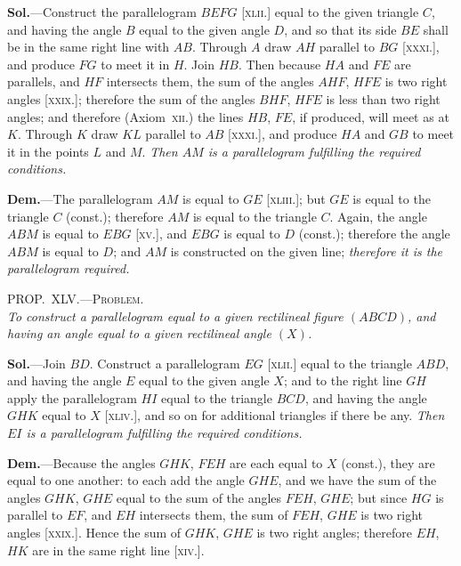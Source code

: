 \documentclass[oneside]{book}
\newcommand\myprop[2]{
\bigskip\Needspace*{4\baselineskip}\begin{center}\textsc{#1}\\\medskip\emph{#2}\par\end{center}
}
\newcommand\imgcent[2]{
\begin{center}

\end{center}
}
\begin{document}
\textbf{Sol.}---Construct the parallelogram $BEFG$ [\textsc{xlii}.] equal
to the given triangle $C$, and having the angle $B$ equal
to the given angle $D$, and so that its side $BE$ shall be in
the same right line with $AB$. Through $A$ draw $AH$
parallel to $BG$ [\textsc{xxxi}.], and produce $FG$ to meet it in $H$.
Join $HB$. Then because $HA$ and $FE$ are parallels, and
$HF$ intersects them, the sum of the angles $AHF$, $HFE$
is two right angles [\textsc{xxix}.]; therefore the sum of the
angles $BHF$, $HFE$ is less than two right angles; and
therefore (Axiom~\textsc{xii}.) the lines $HB$, $FE$, if produced,
will meet as at $K$. Through $K$ draw $KL$ parallel to
$AB$ [\textsc{xxxi}.], and produce $HA$ and $GB$ to meet it in the
points $L$ and $M$. \emph{Then $AM$ is a parallelogram fulfilling
the required conditions.}

\textbf{Dem.}---The parallelogram $AM$ is equal to $GE$
[\textsc{xliii}.]; but $GE$ is equal to the triangle $C$ (const.);
therefore $AM$ is equal to the triangle $C$. Again, the
angle $ABM$ is equal to $EBG$ [\textsc{xv}.], and $EBG$ is equal
to $D$ (const.); therefore the angle $ABM$ is equal to $D$;
and $AM$ is constructed on the given line; \emph{therefore it is
the parallelogram required.}




\myprop{PROP\@.~XLV\@.---Problem.}{To construct a parallelogram equal to a given rectilineal
figure $(ABCD)$, and having an angle equal to a given rectilineal angle $(X)$.}


\imgcent{230}{f067}

\textbf{Sol.}---Join $BD$. Construct a parallelogram $EG$
[\textsc{xlii.}] equal to the triangle $ABD$, and having the
angle $E$ equal to the given angle $X$; and to the right
line $GH$ apply the parallelogram $HI$ equal to the triangle
$BCD$, and having the angle $GHK$ equal to $X$
[\textsc{xliv.}], and so on for additional triangles if there be
any. \textit{Then $EI$ is a parallelogram fulfilling the required
conditions.}

\textbf{Dem.}---Because the angles $GHK$, $FEH$ are each
equal to $X$ (const.), they are equal to one another: to
each add the angle $GHE$, and we have the sum of the
angles $GHK$, $GHE$ equal to the sum of the angles
$FEH$, $GHE$; but since $HG$ is parallel to $EF$, and $EH$
intersects them, the sum of $FEH$, $GHE$ is two right
angles [\textsc{xxix.}]. Hence the sum of $GHK$, $GHE$ is two
right angles; therefore $EH$, $HK$ are in the same right
line [\textsc{xiv.}].
\end{document}
